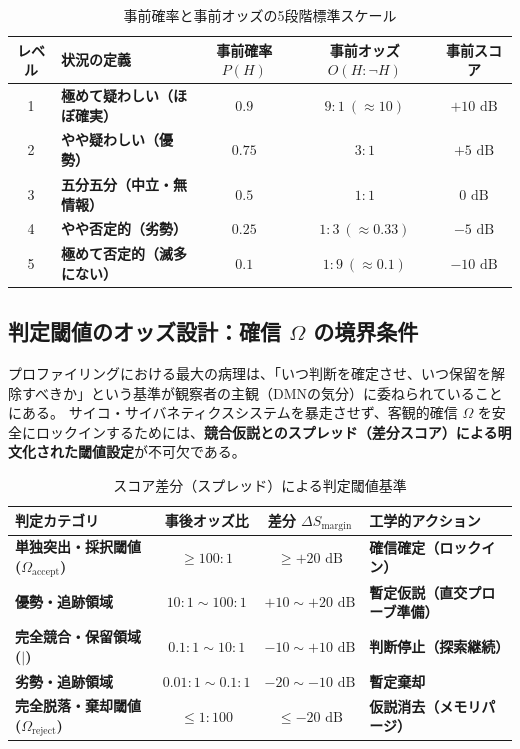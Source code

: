 \begin{table}
\centering
\caption{事前確率と事前オッズの5段階標準スケール}
\label{tab:prior_odds_scale}
\begin{tabular}{clccc}
\hline
レベル & 状況の定義 & 事前確率 $P(H)$ & 事前オッズ $O(H : \neg H)$ & 事前スコア \\
\hline
1 & \textbf{極めて疑わしい（ほぼ確実）} & $0.9$ & $9 : 1 \ (\approx 10)$ & $+10\text{ dB}$ \\
2 & \textbf{やや疑わしい（優勢）} & $0.75$ & $3 : 1$ & $+5\text{ dB}$ \\
3 & \textbf{五分五分（中立・無情報）} & $0.5$ & $1 : 1$ & $0\text{ dB}$ \\
4 & \textbf{やや否定的（劣勢）} & $0.25$ & $1 : 3 \ (\approx 0.33)$ & $-5\text{ dB}$ \\
5 & \textbf{極めて否定的（滅多にない）} & $0.1$ & $1 : 9 \ (\approx 0.1)$ & $-10\text{ dB}$ \\
\hline
\end{tabular}
\end{table}

\subsection{判定閾値のオッズ設計：確信 $\Omega$ の境界条件}

プロファイリングにおける最大の病理は、「いつ判断を確定させ、いつ保留を解除すべきか」という基準が観察者の主観（DMNの気分）に委ねられていることにある。
サイコ・サイバネティクスシステムを暴走させず、客観的確信 $\Omega$ を安全にロックインするためには、\textbf{競合仮説とのスプレッド（差分スコア）による明文化された閾値設定}が不可欠である。

\begin{table}
\centering
\caption{スコア差分（スプレッド）による判定閾値基準}
\label{tab:odds_threshold}
\begin{tabular}{lccl}
\hline
判定カテゴリ & 事後オッズ比 & 差分 $\Delta S_{\mathrm{margin}}$ & 工学的アクション \\
\hline
\textbf{単独突出・採択閾値 ($\Omega_{\mathrm{accept}}$)} & $\ge 100 : 1$ & $\ge +20\text{ dB}$ & \textbf{確信確定（ロックイン）} \\
\textbf{優勢・追跡領域} & $10 : 1 \sim 100 : 1$ & $+10 \sim +20\text{ dB}$ & \textbf{暫定仮説（直交プローブ準備）} \\
\textbf{完全競合・保留領域 ($\mid$)} & $0.1 : 1 \sim 10 : 1$ & $-10 \sim +10\text{ dB}$ & \textbf{判断停止（探索継続）} \\
\textbf{劣勢・追跡領域} & $0.01 : 1 \sim 0.1 : 1$ & $-20 \sim -10\text{ dB}$ & \textbf{暫定棄却} \\
\textbf{完全脱落・棄却閾値 ($\Omega_{\mathrm{reject}}$)} & $\le 1 : 100$ & $\le -20\text{ dB}$ & \textbf{仮説消去（メモリパージ）} \\
\hline
\end{tabular}
\end{table}

